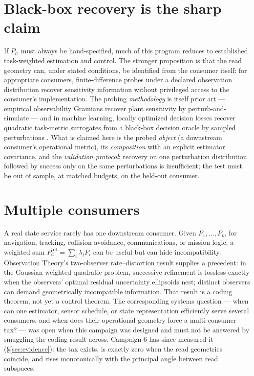 \documentclass{article}
\theoremstyle{definition}
\theoremstyle{remark}
\newcommand{\PC}{P_{\mathcal{C}}}
\begin{document}
\section{Black-box recovery is the sharp claim}
\label{sec:recovery}

If $\PC$ must always be hand-specified, much of this program reduces to
established task-weighted estimation and control. The stronger proposition is
that the read geometry can, under stated conditions, be identified from the
consumer itself: for appropriate consumers, finite-difference probes under a
declared observation distribution recover sensitivity information without
privileged access to the consumer's implementation. The probing
\emph{methodology} is itself prior art --- empirical observability Gramians
recover plant sensitivity by perturb-and-simulate \citep{krenderide2009} ---
and in machine learning, locally optimized decision losses recover quadratic
task-metric surrogates from a black-box decision oracle by sampled
perturbations \citep{shah2022,shah2024}. What is claimed here is the probed
\emph{object} (a downstream consumer's operational metric), its
\emph{composition} with an explicit estimator covariance, and the
\emph{validation protocol}: recovery on one perturbation distribution
followed by success only on the same perturbations is insufficient; the test
must be out of sample, at matched budgets, on the held-out consumer.

\section{Multiple consumers}
\label{sec:multi}

A real state service rarely has one downstream consumer. Given
$P_1,\dots,P_m$ for navigation, tracking, collision avoidance,
communications, or mission logic, a weighted sum $\PC^{\mathrm{tot}}=\sum_i
\lambda_i P_i$ can be useful but can hide incompatibility. Observation
Theory's two-observer rate--distortion result supplies a precedent: in the
Gaussian weighted-quadratic problem, successive refinement is lossless
exactly when the observers' optimal residual uncertainty ellipsoids nest;
distinct observers can demand geometrically incompatible information. That
result is a coding theorem, not yet a control theorem. The corresponding
systems question --- when can one estimator, sensor schedule, or state
representation efficiently serve several consumers, and when does their
operational geometry force a multi-consumer tax? --- was open when this
campaign was designed and must not be answered by smuggling the coding
result across. Campaign 6 has since measured it (\S\ref{sec:evidence}):
the tax exists, is exactly zero when the read geometries coincide, and
rises monotonically with the principal angle between read subspaces.
\end{document}
